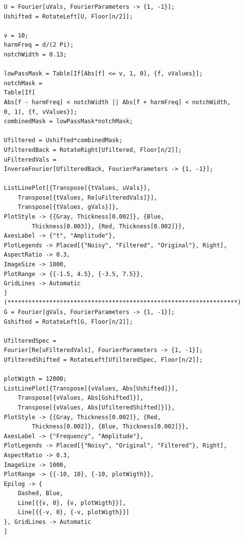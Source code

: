 \documentclass[a4paper,12pt]{article}
\begin{document}
\begin{lstlisting}[caption={Фильтрация специфических частот. Отрисовка сигналов и фурье-образов}]
U = Fourier[uVals, FourierParameters -> {1, -1}];
Ushifted = RotateLeft[U, Floor[n/2]];

v = 10; 
harmFreq = d/(2 Pi);
notchWidth = 0.13;

lowPassMask = Table[If[Abs[f] <= v, 1, 0], {f, vValues}];
notchMask = 
Table[If[
Abs[f - harmFreq] < notchWidth || Abs[f + harmFreq] < notchWidth, 
0, 1], {f, vValues}];
combinedMask = lowPassMask*notchMask;

Ufiltered = Ushifted*combinedMask;
UfilteredBack = RotateRight[Ufiltered, Floor[n/2]];
uFilteredVals = 
InverseFourier[UfilteredBack, FourierParameters -> {1, -1}];

ListLinePlot[{Transpose[{tValues, uVals}], 
	Transpose[{tValues, Re[uFilteredVals]}], 
	Transpose[{tValues, gVals}]},
PlotStyle -> {{Gray, Thickness[0.002]}, {Blue, 
		Thickness[0.003]}, {Red, Thickness[0.002]}},
AxesLabel -> {"t", "Amplitude"},
PlotLegends -> Placed[{"Noisy", "Filtered", "Original"}, Right],
AspectRatio -> 0.3,
ImageSize -> 1000,
PlotRange -> {{-1.5, 4.5}, {-3.5, 7.5}}, 
GridLines -> Automatic
]
(******************************************************************)
G = Fourier[gVals, FourierParameters -> {1, -1}];
Gshifted = RotateLeft[G, Floor[n/2]];

UfilteredSpec = 
Fourier[Re[uFilteredVals], FourierParameters -> {1, -1}];
UfilteredShifted = RotateLeft[UfilteredSpec, Floor[n/2]];

plotWigth = 12000;
ListLinePlot[{Transpose[{vValues, Abs[Ushifted]}], 
	Transpose[{vValues, Abs[Gshifted]}], 
	Transpose[{vValues, Abs[UfilteredShifted]}]}, 
PlotStyle -> {{Gray, Thickness[0.002]}, {Red, 
		Thickness[0.002]}, {Blue, Thickness[0.002]}},
AxesLabel -> {"Frequency", "Amplitude"},
PlotLegends -> Placed[{"Noisy", "Original", "Filtered"}, Right],
AspectRatio -> 0.3,
ImageSize -> 1000,
PlotRange -> {{-10, 10}, {-10, plotWigth}}, 
Epilog -> {
	Dashed, Blue,
	Line[{{v, 0}, {v, plotWigth}}],
	Line[{{-v, 0}, {-v, plotWigth}}]
}, GridLines -> Automatic
]
\end{lstlisting}
\end{document}
